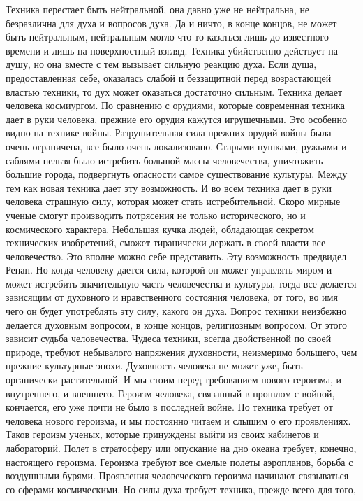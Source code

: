 Техника перестает быть нейтральной, она давно уже не нейтральна, не 
безразлична для духа и вопросов духа. Да и ничто, в конце концов, не может 
быть нейтральным, нейтральным могло что-то казаться лишь до известного времени 
и лишь на поверхностный взгляд. Техника убийственно действует на душу, но она 
вместе с тем вызывает сильную реакцию духа. Если душа, предоставленная себе, 
оказалась слабой и беззащитной перед возрастающей властью техники, то дух 
может оказаться достаточно сильным. Техника делает человека космиургом. По 
сравнению с орудиями, которые современная техника дает в руки человека, 
прежние его орудия кажутся игрушечными. Это особенно видно на технике войны. 
Разрушительная сила прежних орудий войны была очень ограничена, все было очень 
локализовано. Старыми пушками, ружьями и саблями нельзя было истребить большой 
массы человечества, уничтожить большие города, подвергнуть опасности самое 
существование культуры. Между тем как новая техника дает эту возможность. И 
во всем техника дает в руки человека страшную силу, которая может стать 
истребительной. Скоро мирные ученые смогут производить потрясения не только 
исторического, но и космического характера. Небольшая кучка людей, обладающая 
секретом технических изобретений, сможет тиранически держать в своей власти 
все человечество. Это вполне можно себе представить. Эту возможность 
предвидел Ренан. Но когда человеку дается сила, которой он может управлять 
миром и может истребить значительную часть человечества и культуры, тогда все 
делается зависящим от духовного и нравственного состояния человека, от того, 
во имя чего он будет употреблять эту силу, какого он духа. Вопрос техники 
неизбежно делается духовным вопросом, в конце концов, религиозным вопросом. 
От этого зависит судьба человечества. Чудеса техники, всегда двойственной по 
своей природе, требуют небывалого напряжения духовности, неизмеримо большего, 
чем прежние культурные эпохи. Духовность человека не может уже, быть 
органически-растительной. И мы стоим перед требованием нового героизма, и 
внутреннего, и внешнего. Героизм человека, связанный в прошлом с войной, 
кончается, его уже почти не было в последней войне. Но техника требует от 
человека нового героизма, и мы постоянно читаем и слышим о его проявлениях. 
Таков героизм ученых, которые принуждены выйти из своих кабинетов и 
лабораторий. Полет в стратосферу или опускание на дно океана требует, конечно, 
настоящего героизма. Героизма требуют все смелые полеты аэропланов, борьба с 
воздушными бурями. Проявления человеческого героизма начинают связываться со 
сферами космическими. Но силы духа требует техника, прежде всего для того, 
